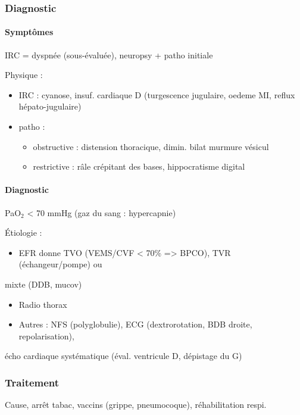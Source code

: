 \documentclass[11pt]{article}
\begin{document}
\subsubsection{Diagnostic}
\label{sec:org17a8ab4}
\label{sec:orgf8776e2}
\paragraph{Symptômes}
\label{sec:orgffd2659}
\label{sec:org35a8cf3}
IRC = dyspnée (sous-évaluée), neuropsy + patho initiale

Physique : 

\begin{itemize}
\item IRC : cyanose, insuf. cardiaque D (turgescence jugulaire, oedeme MI, reflux
hépato-jugulaire)
\item patho : 

\begin{itemize}
\item obstructive : distension thoracique, dimin. bilat murmure vésicul
\item restrictive : râle crépitant des bases, hippocratisme digital
\end{itemize}
\end{itemize}



\paragraph{Diagnostic}
\label{sec:orgcbf1bad}
\label{sec:org7599c0f}
PaO\(_{\text{2}}\) < 70 mmHg (gaz du sang : hypercapnie)

Étiologie :

\begin{itemize}
\item EFR donne TVO (VEMS/CVF < 70\% => BPCO), TVR (échangeur/pompe) ou
\end{itemize}
mixte (DDB, mucov)
\begin{itemize}
\item Radio thorax
\item Autres : NFS (polyglobulie), ECG (dextrorotation, BDB droite, repolarisation),
\end{itemize}
écho cardiaque systématique (éval. ventricule D, dépistage du G)


\subsubsection{Traitement}
\label{sec:org9a52f0b}
\label{sec:org870a2d5}
Cause, arrêt tabac, vaccins (grippe, pneumocoque), réhabilitation respi.
\end{document}
